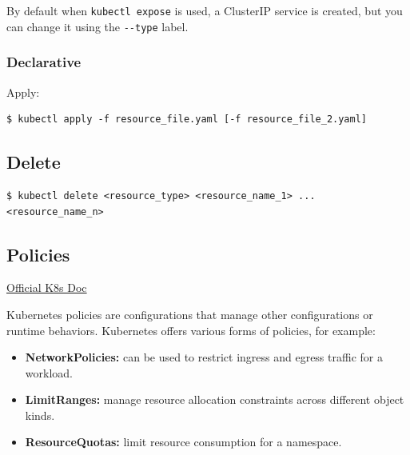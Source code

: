 \documentclass{article}
\newenvironment{blocktemplate}[1]{%
    \tcolorbox[beamer,%
    noparskip,breakable,
    colframe=Blue,%
    colbacklower=LimeGreen!75!LightGreen,%
    title=#1]}%
    {\endtcolorbox}
\newenvironment{codetemplate}[1][]{%
  \mybasecolorbox[#1]
  \itshape
}{%
  \endmybasecolorbox
}
\begin{document}
\begin{blocktemplate}{NOTE}
By default when \verb|kubectl expose| is used, a ClusterIP service is created, but you can change it using the \verb|--type| label.
\end{blocktemplate}

\subsubsection{Declarative}
Apply:
\begin{codetemplate}
\begin{verbatim}
$ kubectl apply -f resource_file.yaml [-f resource_file_2.yaml]
\end{verbatim}
\end{codetemplate}

\subsection{Delete}
\begin{codetemplate}
\begin{verbatim}
$ kubectl delete <resource_type> <resource_name_1> ... <resource_name_n>
\end{verbatim}
\end{codetemplate}

\subsection{Policies}

\href{https://kubernetes.io/docs/concepts/policy/}{Official K8s Doc}

Kubernetes policies are configurations that manage other configurations or runtime behaviors. Kubernetes offers various forms of policies, for example:

\begin{itemize}
    \item \textbf{NetworkPolicies:} can be used to restrict ingress and egress traffic for a workload.
    \item \textbf{LimitRanges:} manage resource allocation constraints across different object kinds.
    \item \textbf{ResourceQuotas:} limit resource consumption for a namespace.
\end{itemize}
\end{document}
